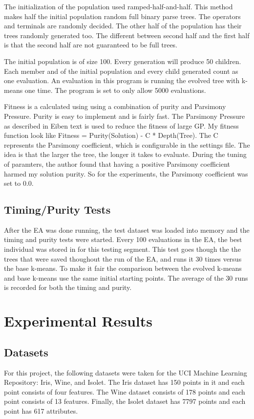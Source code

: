 \documentclass[conference]{IEEEtran}
\begin{document}
The initialization of the population used ramped-half-and-half\cite{EibenAE2007}.  This method makes half the initial population random full binary parse trees.  The operators and terminals are randomly decided.  The other half of the population has their trees randomly generated too.  The different between second half and the first half is that the second half are not guaranteed to be full trees.

The initial population is of size 100.  Every generation will produce 50 children.  Each member and of the initial population and every child generated count as one evaluation.  An evaluation in this program is running the evolved tree with k-means one time.  The program is set to only allow 5000 evaluations.

Fitness is a calculated using using a combination of purity\cite{Manning2008} and Parsimony Pressure\cite{EibenAE2007}.  Purity is easy to implement and is fairly fast.  The Parsimony Pressure as described in Eiben text is used to reduce the fitness of large GP.  My fitness function look like Fitness = Purity(Solution) - C * Depth(Tree).  The C represents the Parsimony coefficient, which is configurable in the settings file.  The idea is that the larger the tree, the longer it takes to evaluate.  During the tuning of paramters, the author found that having a positive Parsimony coefficient harmed my solution purity.  So for the experiments, the Parsimony coefficient was set to 0.0.
\subsection{Timing/Purity Tests}
After the EA was done running, the test dataset was loaded into memory and the timing and purity tests were started.  Every 100 evaluations in the EA, the best individual was stored in for this testing segment.  This test goes though the the trees that were saved thoughout the run of the EA, and runs it 30 times versus the base k-means.  To make it fair the comparison between the evolved k-means and base k-means use the same initial starting points.  The average of the 30 runs is recorded for both the timing and purity.

\clearpage

\section{Experimental Results}
\subsection{Datasets}
For this project, the following datasets were taken for the UCI Machine Learning Repository: Iris, Wine, and Isolet\cite{Dua:2017}.  The Iris dataset has 150 points in it and each point consists of four features.  The Wine dataset consists of 178 points and each point consists of 13 features.  Finally, the Isolet dataset has 7797 points and each point has 617 attributes.
\end{document}
